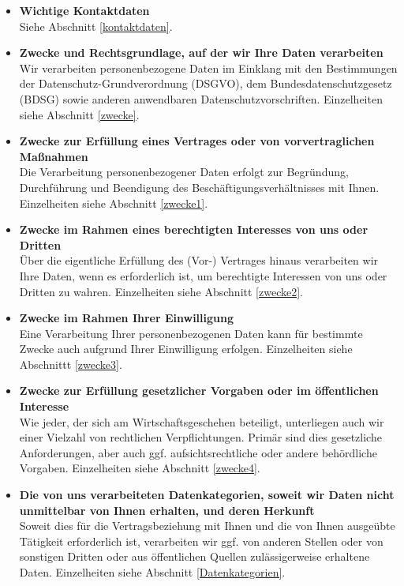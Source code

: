 \documentclass[a4paper, fontsize=11pt]{scrartcl}
\begin{document}
\begin{itemize}
    \item \textbf{Wichtige Kontaktdaten} \\ Siehe Abschnitt \ref{kontaktdaten}.
    \item \textbf{Zwecke und Rechtsgrundlage, auf der wir Ihre Daten verarbeiten} \\ Wir verarbeiten personenbezogene Daten im Einklang mit den Bestimmungen der Datenschutz-Grundverordnung (DSGVO), dem Bundesdatenschutzgesetz (BDSG) sowie anderen anwendbaren Datenschutzvorschriften. Einzelheiten siehe Abschnitt \ref{zwecke}.
    \item \textbf{Zwecke zur Erfüllung eines Vertrages oder von vorvertraglichen Maßnahmen} \\ Die Verarbeitung personenbezogener Daten erfolgt zur Begründung, Durchführung und Beendigung des Beschäftigungsverhältnisses mit Ihnen. Einzelheiten siehe Abschnitt \ref{zwecke1}.
    \item \textbf{Zwecke im Rahmen eines berechtigten Interesses von uns oder Dritten} \\ Über die eigentliche Erfüllung des (Vor-) Vertrages hinaus verarbeiten wir Ihre Daten, wenn es erforderlich ist, um berechtigte Interessen von uns oder Dritten zu wahren. Einzelheiten siehe Abschnitt \ref{zwecke2}.
    \item \textbf{Zwecke im Rahmen Ihrer Einwilligung} \\ Eine Verarbeitung Ihrer personenbezogenen Daten kann für bestimmte Zwecke auch aufgrund Ihrer Einwilligung erfolgen. Einzelheiten siehe Abschnittt \ref{zwecke3}.
    \item \textbf{Zwecke zur Erfüllung gesetzlicher Vorgaben oder im öffentlichen Interesse} \\ Wie jeder, der sich am Wirtschaftsgeschehen beteiligt, unterliegen auch wir einer Vielzahl von rechtlichen Verpflichtungen. Primär sind dies gesetzliche Anforderungen, aber auch ggf. aufsichtsrechtliche oder andere behördliche Vorgaben. Einzelheiten siehe Abschnitt \ref{zwecke4}.
    \item \textbf{Die von uns verarbeiteten Datenkategorien, soweit wir Daten nicht unmittelbar von Ihnen erhalten, und deren Herkunft} \\ Soweit dies für die Vertragsbeziehung mit Ihnen und die von Ihnen ausgeübte Tätigkeit erforderlich ist, verarbeiten wir ggf. von anderen Stellen oder von sonstigen Dritten oder aus öffentlichen Quellen zulässigerweise erhaltene Daten. Einzelheiten siehe Abschnitt \ref{Datenkategorien}.

\end{itemize}
\end{document}
